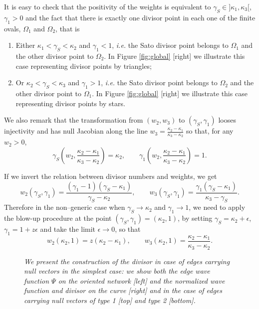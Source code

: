 \documentclass[11pt]{amsart}
\theoremstyle{plain}
\numberwithin{equation}{section}
\begin{document}
It is easy to check that the positivity of the weights is equivalent to $\gamma_S \in]\kappa_1,\kappa_3[$, $\gamma_1>0$ and the fact that there is exactly one divisor point in each one of the finite ovals, $\Omega_1$ and $\Omega_2$, that is
\begin{enumerate}
\item Either $\kappa_1 <\gamma_S<\kappa_2$ and $\gamma_1<1$, {\sl i.e.} the Sato divisor point belongs to $\Omega_1$ and the other divisor point to $\Omega_2$. In Figure \ref{fig:global} [right] we illustrate this case representing divisor points by triangles;
\item Or $\kappa_2 <\gamma_S<\kappa_3$ and $\gamma_1>1$, {\sl i.e.} the Sato divisor point belongs to $\Omega_2$ and the other divisor point to $\Omega_1$. In Figure \ref{fig:global} [right] we illustrate this case representing divisor points by stars.
\end{enumerate}
We also remark that the transformation from $(w_2,w_3)$ to $(\gamma_S,\gamma_1)$ looses injectivity and has null Jacobian along the line $w_3=\frac{\kappa_2-\kappa_1}{\kappa_3-\kappa_2}$ so that, for any $w_2>0$,
\[
\gamma_S ( w_2, \frac{\kappa_2-\kappa_1}{\kappa_3-\kappa_2} )=\kappa_2, \quad\quad \gamma_1 ( w_2, \frac{\kappa_2-\kappa_1}{\kappa_3-\kappa_2} )=1.
\]

If we invert the relation between divisor numbers and weights, we get
\[
w_2 (\gamma_S,\gamma_1)= \frac{(\gamma_1 -1)(\gamma_S-\kappa_1)}{\gamma_S-\kappa_2},\quad\quad w_3 (\gamma_S,\gamma_1)= \frac{\gamma_1(\gamma_S-\kappa_1)}{\kappa_3-\gamma_S}.
\]
Therefore in the non--generic case when $\gamma_S\to\kappa_2$ and $\gamma_1\to 1$, we need to apply the blow-up procedure at the point $(\gamma_S,\gamma_1)=(\kappa_2,1)$, by setting $\gamma_S=\kappa_2+\epsilon$, $\gamma_1=1+z\epsilon$ and take the limit $\epsilon\to 0$, so that
\[
w_2 (\kappa_2,1) = z(\kappa_2-\kappa_1),\quad\quad w_3 (\kappa_2,1) = \frac{\kappa_2-\kappa_1}{\kappa_3-\kappa_2}.
\]


\begin{figure}%
	\vspace{-.4 truecm}
  \caption{\small{\sl We present the construction of the divisor in case of edges carrying null vectors in the simplest case: we show both the edge wave function $\Psi$ on the oriented network [left] and the normalized wave function and divisor on the curve [right] and in the case of edges carrying null vectors of type 1 [top] and type 2 [bottom].}\label{fig:div_null}}
\end{figure}
\end{document}
